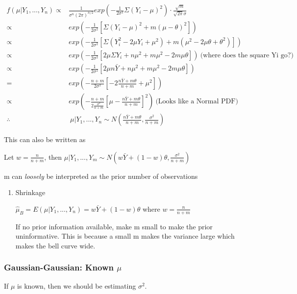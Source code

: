 \documentclass[11pt]{article}
\begin{document}
\begin{equation}
\begin{split}
f(\mu | Y_1, ..., Y_n) \propto & \frac{1}{\sigma^n (2 \pi)^{n/2}} exp(- \frac{1}{2 \sigma^2} \Sigma (Y_i - \mu)^2) \cdot \frac{\sqrt{m}}{\sqrt{2 \pi} \sigma}\\
\propto & exp(- \frac{1}{2 \sigma^2} [ \Sigma (Y_i - \mu)^2 + m (\mu - \theta)^2])\\
\propto & exp(- \frac{1}{2 \sigma^2} [ \Sigma (Y_i^2 - 2 \mu Y_i + \mu^2) + m (\mu^2 - 2 \mu \theta + \theta^2)])\\
\propto & exp(- \frac{1}{2 \sigma^2} [ 2 \mu \Sigma Y_i + n \mu^2 + m \mu^2 - 2 m \mu \theta]) \ \text{(where does the square Yi go?)}\\
\propto & exp(- \frac{1}{2 \sigma^2} [ 2 \mu n \bar Y + n \mu^2 + m \mu^2 - 2 m \mu \theta])\\
= & exp(- \frac{n + m}{2 \sigma^2} [ - 2 \frac{n \bar Y + m \theta}{n + m} + \mu^2])\\
\propto & exp(- \frac{n + m}{2 \frac{\sigma^2}{n + m}} [ \mu - \frac{n \bar Y + m \theta}{n + m}]^2) \ \text{(Looks like a Normal PDF)}\\
\therefore & \ \mu | Y_1, ..., Y_n \sim N(\frac{n \bar Y + m \theta}{n + m}, \frac{\sigma^2}{n + m})
\end{split}
\end{equation}

This can also be written as

Let \(w = \frac{n}{n+m}\), then \(\mu | Y_1, ..., Y_m \sim N(w \bar Y + (1 - w)
\theta, \frac{\sigma^2}{n + m})\)

m can \emph{loosely} be interpreted as the prior number of observations

\begin{enumerate}
\item Shrinkage
\label{sec:orgd19ec90}

\(\hat \mu_B = E(\mu | Y_1, ..., Y_n) = w \bar Y + (1 - w) \theta\) where \(w =
\frac{n}{n + m}\)

If no prior information available, make m small to make the prior uninformative.
This is because a small m makes the variance large which makes the bell curve
wide.
\end{enumerate}

\subsubsection{Gaussian-Gaussian: Known \(\mu\)}
\label{sec:orga18c238}
If \(\mu\) is known, then we should be estimating \(\sigma^2\).
\end{document}
